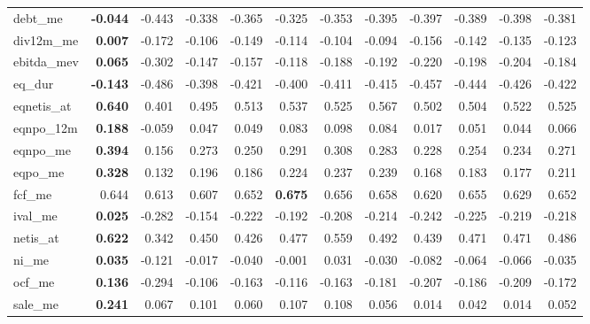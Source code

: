 \begin{landscape}
\begin{longtable}{>{\raggedright\arraybackslash}p{2.6cm}rrrrrrrrrrr}
debt\_me & \textbf{-0.044} & -0.443 & -0.338 & -0.365 & -0.325 & -0.353 & -0.395 & -0.397 & -0.389 & -0.398 & -0.381 \\
div12m\_me & \textbf{0.007} & -0.172 & -0.106 & -0.149 & -0.114 & -0.104 & -0.094 & -0.156 & -0.142 & -0.135 & -0.123 \\
ebitda\_mev & \textbf{0.065} & -0.302 & -0.147 & -0.157 & -0.118 & -0.188 & -0.192 & -0.220 & -0.198 & -0.204 & -0.184 \\
eq\_dur & \textbf{-0.143} & -0.486 & -0.398 & -0.421 & -0.400 & -0.411 & -0.415 & -0.457 & -0.444 & -0.426 & -0.422 \\
eqnetis\_at & \textbf{0.640} & 0.401 & 0.495 & 0.513 & 0.537 & 0.525 & 0.567 & 0.502 & 0.504 & 0.522 & 0.525 \\
eqnpo\_12m & \textbf{0.188} & -0.059 & 0.047 & 0.049 & 0.083 & 0.098 & 0.084 & 0.017 & 0.051 & 0.044 & 0.066 \\
eqnpo\_me & \textbf{0.394} & 0.156 & 0.273 & 0.250 & 0.291 & 0.308 & 0.283 & 0.228 & 0.254 & 0.234 & 0.271 \\
eqpo\_me & \textbf{0.328} & 0.132 & 0.196 & 0.186 & 0.224 & 0.237 & 0.239 & 0.168 & 0.183 & 0.177 & 0.211 \\
fcf\_me & 0.644 & 0.613 & 0.607 & \cellcolor{blue!10}0.652 & \textbf{\cellcolor{blue!10}0.675} & \cellcolor{blue!10}0.656 & \cellcolor{blue!10}0.658 & 0.620 & \cellcolor{blue!10}0.655 & 0.629 & \cellcolor{blue!10}0.652 \\
ival\_me & \textbf{0.025} & -0.282 & -0.154 & -0.222 & -0.192 & -0.208 & -0.214 & -0.242 & -0.225 & -0.219 & -0.218 \\
netis\_at & \textbf{0.622} & 0.342 & 0.450 & 0.426 & 0.477 & 0.559 & 0.492 & 0.439 & 0.471 & 0.471 & 0.486 \\
ni\_me & \textbf{0.035} & -0.121 & -0.017 & -0.040 & -0.001 & 0.031 & -0.030 & -0.082 & -0.064 & -0.066 & -0.035 \\
ocf\_me & \textbf{0.136} & -0.294 & -0.106 & -0.163 & -0.116 & -0.163 & -0.181 & -0.207 & -0.186 & -0.209 & -0.172 \\
sale\_me & \textbf{0.241} & 0.067 & 0.101 & 0.060 & 0.107 & 0.108 & 0.056 & 0.014 & 0.042 & 0.014 & 0.052 \\
\hline
\end{longtable}
\endgroup
\end{landscape}
